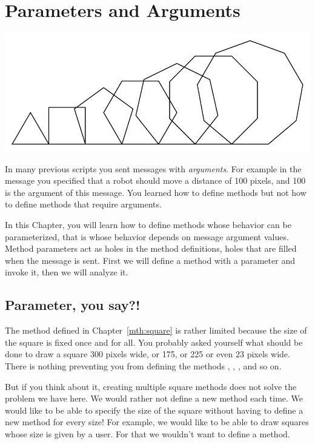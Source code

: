 \ifx\wholebook\relax\else



\fi


\chapter{Parameters and Arguments}\label{ch:argumenting}

\begin{chapterfigure}
\includegraphics[width=0.9\linewidth]{ArgumentTitle}
\end{chapterfigure}

In many previous scripts you sent messages with \emph{arguments}. For example in the message  you specified that a robot should move a distance of 100 pixels,  and 100 is the argument of this message. You learned how to define methods but not how to define methods that require arguments. 

In this Chapter, you will learn how to define methods whose behavior can be parameterized, that is whose behavior depends on message argument values. Method parameters act as holes in the method definitions, holes that are filled when the message is sent.  First we will define a method with a parameter and invoke it, then we will analyze it.


\section{Parameter, you say?!}
The method  defined in Chapter~\ref{mth:square} is
rather limited because the size of the square is fixed once and for all. You probably asked yourself what should be done to draw a square  300 pixels wide, or 175, or 225 or even 23 pixels wide.  There is nothing preventing you from defining the methods , , ,  and so on. 

But if you think about it, creating multiple square methods does not solve the problem we have here. We would rather not define a new method each time. We would like to be able to specify the size of the square without having to define  a new method for every size! For example, we would like to be able to draw squares whose size is given by a user. For that we wouldn't want to define a method.

